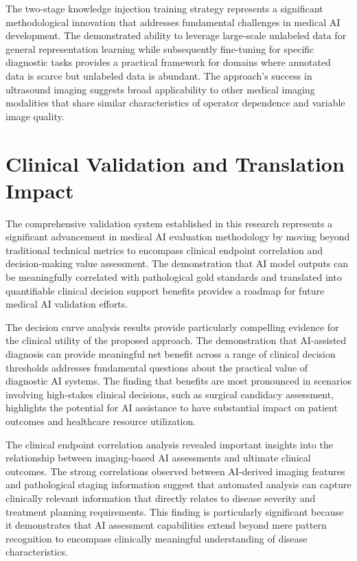 The two-stage knowledge injection training strategy represents a significant methodological innovation that addresses fundamental challenges in medical AI development. The demonstrated ability to leverage large-scale unlabeled data for general representation learning while subsequently fine-tuning for specific diagnostic tasks provides a practical framework for domains where annotated data is scarce but unlabeled data is abundant. The approach's success in ultrasound imaging suggests broad applicability to other medical imaging modalities that share similar characteristics of operator dependence and variable image quality.

\section{Clinical Validation and Translation Impact}

The comprehensive validation system established in this research represents a significant advancement in medical AI evaluation methodology by moving beyond traditional technical metrics to encompass clinical endpoint correlation and decision-making value assessment. The demonstration that AI model outputs can be meaningfully correlated with pathological gold standards and translated into quantifiable clinical decision support benefits provides a roadmap for future medical AI validation efforts.

The decision curve analysis results provide particularly compelling evidence for the clinical utility of the proposed approach. The demonstration that AI-assisted diagnosis can provide meaningful net benefit across a range of clinical decision thresholds addresses fundamental questions about the practical value of diagnostic AI systems. The finding that benefits are most pronounced in scenarios involving high-stakes clinical decisions, such as surgical candidacy assessment, highlights the potential for AI assistance to have substantial impact on patient outcomes and healthcare resource utilization.

The clinical endpoint correlation analysis revealed important insights into the relationship between imaging-based AI assessments and ultimate clinical outcomes. The strong correlations observed between AI-derived imaging features and pathological staging information suggest that automated analysis can capture clinically relevant information that directly relates to disease severity and treatment planning requirements. This finding is particularly significant because it demonstrates that AI assessment capabilities extend beyond mere pattern recognition to encompass clinically meaningful understanding of disease characteristics.

